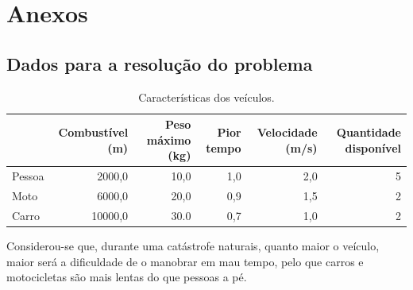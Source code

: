 \documentclass[12pt, a4paper]{article}
\begin{document}
\section{Anexos}

\subsection{Dados para a resolução do problema}
\label{problem-data}

\begin{table}[H]
    \small

    \begin{adjustwidth}{-1.5cm}{-1.5cm}
        \begin{center}
            \begin{tabular}{|l|r|r|r|r|r|}
                \hline
                                                &
                    Combustível (m)             &
                    Peso máximo (kg)            &
                    Pior tempo &
                    Velocidade (m/s)            &
                    Quantidade disponível \\

                \hline
                Pessoa & 2000,0  & 10,0 & 1,0 & 2,0 & 5 \\
                \hline
                Moto   & 6000,0  & 20,0 & 0,9 & 1,5 & 2 \\
                \hline
                Carro  & 10000,0 & 30.0 & 0,7 & 1,0 & 2 \\
                \hline
            \end{tabular}
        \end{center}
    \end{adjustwidth}

    \caption{Características dos veículos.}
\end{table}

Considerou-se que, durante uma catástrofe naturais, quanto maior o veículo, maior será a dificuldade
de o manobrar em mau tempo, pelo que carros e motocicletas são mais lentas do que pessoas a pé.
\end{document}
